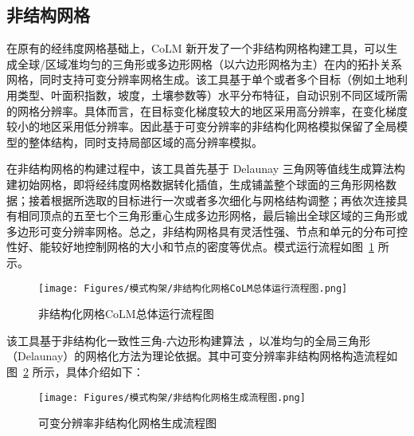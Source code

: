 \subsection{非结构网格}\label{非结构网格}
在原有的经纬度网格基础上，CoLM 新开发了一个非结构网格构建工具，可以生成全球/区域准均匀的三角形或多边形网格（以六边形网格为主）在内的拓扑关系网格，同时支持可变分辨率网格生成。该工具基于单个或者多个目标（例如土地利用类型、叶面积指数，坡度，土壤参数等）水平分布特征，自动识别不同区域所需的网格分辨率。具体而言，在目标变化梯度较大的地区采用高分辨率，在变化梯度较小的地区采用低分辨率。因此基于可变分辨率的非结构化网格模拟保留了全局模型的整体结构，同时支持局部区域的高分辨率模拟。


在非结构网格的构建过程中，该工具首先基于 Delaunay 三角网等值线生成算法构建初始网格，即将经纬度网格数据转化插值，生成铺盖整个球面的三角形网格数据；接着根据所选取的目标进行一次或者多次细化与网格结构调整；再依次连接具有相同顶点的五至七个三角形重心生成多边形网格，最后输出全球区域的三角形或多边形可变分辨率网格。总之，非结构网格具有灵活性强、节点和单元的分布可控性好、能较好地控制网格的大小和节点的密度等优点\citep{fan2024}。模式运行流程如图~\ref{fig:非结构化网格CoLM总体运行流程图} 所示。

{
  \begin{figure}[htbp]
    \centering
    \texttt{[image: Figures/模式构架/非结构化网格CoLM总体运行流程图.png]}
    \caption{非结构化网格CoLM总体运行流程图}
    \label{fig:非结构化网格CoLM总体运行流程图}
  \end{figure}
}

该工具基于非结构化一致性三角-六边形构建算法 \citep{fatichi2020soil,walko2008ocean,walko_direct_2011,fan2024}，以准均匀的全局三角形（Delaunay）的网格化方法为理论依据。其中可变分辨率非结构网格构造流程如图~\ref{fig:非结构化网格生成流程图} 所示，具体介绍如下：
{
  \begin{figure}[htbp]
    \centering
    \texttt{[image: Figures/模式构架/非结构化网格生成流程图.png]}
    \caption{可变分辨率非结构化网格生成流程图}
    \label{fig:非结构化网格生成流程图}
  \end{figure}
}

